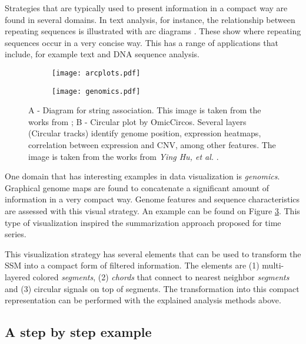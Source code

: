 {Strategies that are typically used to present information in a compact way are found in several domains. In text analysis, for instance, the relationship between repeating sequences is illustrated with arc diagrams \cite{bitmap, arcplots}. These show where repeating sequences occur in a very concise way. This has a range of applications that include, for example text and DNA sequence analysis.

\begin{figure}
    \centering
    \begin{subfigure}{0.5\linewidth}
    \centering
        \texttt{[image: arcplots.pdf]}
        \caption{}
        \label{fig:genomic}
    \end{subfigure}%
    \begin{subfigure}{0.5\linewidth}
        \centering
        \texttt{[image: genomics.pdf]}
        \caption{}
        \label{fig:genomic}
    \end{subfigure}
    \caption{A - Diagram for string association. This image is taken from the works from \cite{arcplots}; B - Circular plot by OmicCircos. Several layers (Circular tracks) identify genome position, expression heatmaps, correlation between expression and CNV, among other features. The image is taken from the works from \textit{Ying Hu, et al.} \cite{genomics}.}
\end{figure}

One domain that has interesting examples in data visualization is \textit{genomics}. Graphical genome maps are found to concatenate a significant amount of information in a very compact way. Genome features and sequence characteristics are assessed with this visual strategy. An example can be found on Figure \ref{fig:genomic}. This type of visualization inspired the summarization approach proposed for time series.
\par
This visualization strategy has several elements that can be used to transform the \gls{SSM} into a compact form of filtered information. The elements are (1) multi-layered colored \textit{segments}, (2) \textit{chords} that connect to nearest neighbor \textit{segments} and (3) circular signals on top of segments. The transformation into this compact representation can be performed with the explained analysis methods above.

\subsection{A step by step example}

}
